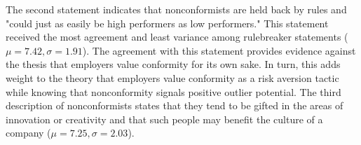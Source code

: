 \documentclass[review]{elsarticle}
\begin{document}
The second statement indicates that nonconformists are held back by rules and "could just as easily be high performers as low performers."
This statement received the most agreement and least variance among rulebreaker statements ($\mu = 7.42, \sigma = 1.91$).
The agreement with this statement provides evidence against the thesis that employers value conformity for its own sake.
In turn, this adds weight to the theory that employers value conformity as a risk aversion tactic while knowing that nonconformity signals positive outlier potential.
The third description of nonconformists states that they tend to be gifted in the areas of innovation or creativity
and that such people may benefit the culture of a company ($\mu = 7.25, \sigma = 2.03$).

\end{document}
